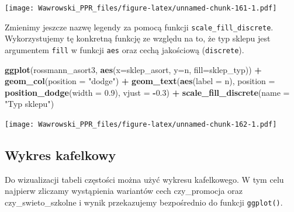 \documentclass[]{book}
\newenvironment{Shaded}{\begin{snugshade}}{\end{snugshade}}
\newcommand{\KeywordTok}[1]{\textcolor[rgb]{0.13,0.29,0.53}{\textbf{#1}}}
\newcommand{\DataTypeTok}[1]{\textcolor[rgb]{0.13,0.29,0.53}{#1}}
\newcommand{\FloatTok}[1]{\textcolor[rgb]{0.00,0.00,0.81}{#1}}
\newcommand{\StringTok}[1]{\textcolor[rgb]{0.31,0.60,0.02}{#1}}
\newcommand{\OperatorTok}[1]{\textcolor[rgb]{0.81,0.36,0.00}{\textbf{#1}}}
\newcommand{\NormalTok}[1]{#1}
\begin{document}
\texttt{[image: Wawrowski\_PPR\_files/figure-latex/unnamed-chunk-161-1.pdf]}

Zmienimy jeszcze nazwę legendy za pomocą funkcji
\texttt{scale\_fill\_discrete}. Wykorzystujemy tę konkretną funkcję ze
względu na to, że typ sklepu jest argumentem \texttt{fill} w funkcji
\texttt{aes} oraz cechą jakościową (\texttt{discrete}).

\begin{Shaded}
\begin{Highlighting}[]
\KeywordTok{ggplot}\NormalTok{(rossmann_asort3, }\KeywordTok{aes}\NormalTok{(}\DataTypeTok{x=}\NormalTok{sklep_asort, }\DataTypeTok{y=}\NormalTok{n, }\DataTypeTok{fill=}\NormalTok{sklep_typ)) }\OperatorTok{+}
\StringTok{  }\KeywordTok{geom_col}\NormalTok{(}\DataTypeTok{position =} \StringTok{"dodge"}\NormalTok{) }\OperatorTok{+}\StringTok{ }
\StringTok{  }\KeywordTok{geom_text}\NormalTok{(}\KeywordTok{aes}\NormalTok{(}\DataTypeTok{label =}\NormalTok{ n), }
            \DataTypeTok{position =} \KeywordTok{position_dodge}\NormalTok{(}\DataTypeTok{width =} \FloatTok{0.9}\NormalTok{),}
            \DataTypeTok{vjust =} \OperatorTok{-}\FloatTok{0.3}\NormalTok{) }\OperatorTok{+}
\StringTok{  }\KeywordTok{scale_fill_discrete}\NormalTok{(}\DataTypeTok{name =} \StringTok{"Typ sklepu"}\NormalTok{)}
\end{Highlighting}
\end{Shaded}

\texttt{[image: Wawrowski\_PPR\_files/figure-latex/unnamed-chunk-162-1.pdf]}

\subsection{Wykres kafelkowy}\label{wykres-kafelkowy}

Do wizualizacji tabeli częstości można użyć wykresu kafelkowego. W tym
celu najpierw zliczamy wystąpienia wariantów cech czy\_promocja oraz
czy\_swieto\_szkolne i wynik przekazujemy bezpośrednio do funkcji
\texttt{ggplot()}.

\begin{Shaded}
\end{Shaded}
\end{document}
